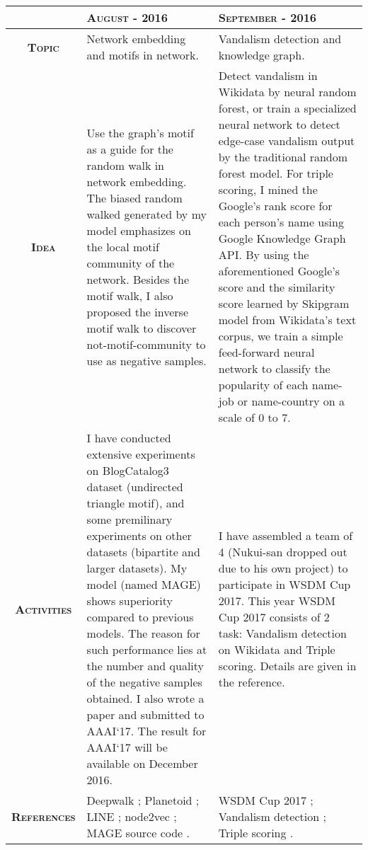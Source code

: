 \documentclass[12pt,twoside]{article}
\begin{document}
\begin{center}
  \renewcommand{\arraystretch}{1.5}
  \begin{longtable}{| c | p{6.5cm} | p{6.5cm} |}
  \hline
  & \textbf{\textsc{August - 2016}} & \textbf{\textsc{September - 2016}} \\ \hline
  \textbf{\textsc{Topic}} & Network embedding and motifs in network. & 
  Vandalism detection and knowledge graph.\\ \hline
  \textbf{\textsc{Idea}} & Use the graph's motif as a guide for the random
  walk in network embedding. The biased random walked generated
  by my model emphasizes on the local motif community of the network.
  Besides the motif walk, I also proposed the inverse motif walk
  to discover not-motif-community to use as negative samples.
  & Detect vandalism in Wikidata by
  neural random forest, or train a specialized neural network
  to detect edge-case vandalism output by the traditional random
  forest model. For triple scoring, I mined the Google's rank score
  for each person's name using Google Knowledge Graph API. By using
  the aforementioned Google's score and the similarity score
  learned by Skipgram model from Wikidata's text corpus, we train
  a simple feed-forward neural network to classify the popularity
  of each name-job or name-country on a scale of 0 to 7. \\ \hline
  \textbf{\textsc{Activities}} & I have conducted extensive experiments
  on BlogCatalog3 dataset (undirected triangle motif), and some 
  premilinary experiments on other datasets (bipartite and larger
  datasets). My model (named MAGE) shows superiority compared to 
  previous models. The reason for such performance lies at the
  number and quality of the negative samples obtained. I also
  wrote a paper and submitted to AAAI`17. The result for AAAI`17
  will be available on December 2016. & I have assembled a team
  of 4 (Nukui-san dropped out due to his own project) to participate
  in WSDM Cup 2017. This year WSDM Cup 2017 consists of 2 task:
  Vandalism detection on Wikidata and Triple scoring. Details
  are given in the reference.\\ \hline
  \textbf{\textsc{References}} & Deepwalk \cite{deepwalk}; 
  Planetoid \cite{planetoid}; LINE \cite{line}; node2vec \cite{n2v};
  MAGE source code \cite{mage}. & WSDM Cup 2017 \cite{wsdmcup}; 
  Vandalism detection \cite{van1}; Triple scoring \cite{trip1}. \\ \hline
  \end{longtable}
\end{center}
\end{document}
